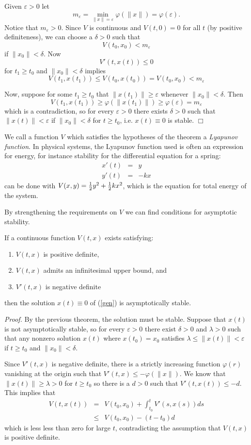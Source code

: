 \documentclass[12pt]{article}
\def\a{for every }
\def\e{there exists }
\def\pf{{\em Proof. }}
\def\eps{\varepsilon}
\def\vphi{\varphi}
\begin{document}
Given $\eps > 0$ let 
$$m_{\eps} = \min_{\| x \| = \eps} \vphi (\| x \| ) = \vphi (\eps).$$ Notice that
$m_{\eps} > 0$.  Since $V$ is continuous and $V(t,0) = 0$ for all $t$
(by positive definiteness),
we can choose a $\delta > 0$ such that 
$$V(t_0, x_0) < m_{\eps}$$ 
if $\|x_0 \| < \delta$.  Now 
$$V'(t,x(t)) \le 0$$ 
for $t_1 \ge t_0$ and $\| x_0 \| < \delta$ implies
$$V(t_1, x(t_1)) \le V(t_0,x(t_0)) = V(t_0,x_0) < m_{\eps}$$

Now, suppose for some $t_1 \ge t_0$ that $\| x(t_1) \| \ge \eps$
whenever $\| x_0 \| < \delta$.  Then 
$$V(t_1,x(t_1)) \ge \vphi (\| x(t_1) \| ) \ge \vphi (\eps) =
m_{\eps}$$
which is a contradiction, so \a $\eps > 0$ \e $\delta > 0$ such that
$\| x(t) \| < \eps$ if $\| x_0 \| < \delta$ for $t \ge t_0$,
i.e. $x(t) \equiv 0$ is stable.  $\Box$

We call a function $V$ which satisfies the hypotheses of the theorem a
{\em Lyapunov function}.  In physical systems, the Lyapunov function
used is often an expression for energy, for instance stability for the
differential equation for a spring: 
\begin{eqnarray*}
x'(t) & = & y\\
y'(t) & = & -kx
\end{eqnarray*}
can be done with $V(x,y) = {1 \over 2} y^2 + {1 \over 2} k x^2$, which is the equation
for total energy of the system.

By strengthening the requirements on $V$ we can find conditions for
asymptotic stability.

\begin{thm}
	If a continuous function $V(t,x)$ exists satisfying:
\begin{enumerate}
\item $V(t,x)$ is positive definite,
\item $V(t,x)$ admits an infinitesimal upper bound, and
\item $V'(t,x)$ is negative definite
\end{enumerate}
then the solution $x(t) \equiv 0$ of (\ref{gen}) is asymptotically
stable.
\end{thm}

\pf  By the previous theorem, the solution must be stable.  Suppose
that $x(t)$ is not asymptotically stable, so \a $\eps >0$ there exist
$\delta > 0$ and $\lambda > 0$ such that any nonzero solution $x(t)$ where
$x(t_0) = x_0$ satisfies $\lambda \le \| x(t) \| < \eps$ if $t \ge
t_0$ and $\| x_0 \| < \delta$.

Since $V'(t,x)$ is negative definite, there is a strictly increasing function
$\vphi (r)$ vanishing at the origin such that $V'(t,x) \le -
\vphi(\| x \|)$.  We know that $\| x(t) \| \ge \lambda > 0$ for $t \ge
t_0$ so there is a $d > 0$ such that $V'(t,x(t)) \le -d$.  This
implies that 
\begin{eqnarray*}
	V(t,x(t)) & = & V(t_0,x_0) + \int^t_{t_0} V'(s,x(s)) ds \\
	& \le & V(t_0,x_0) - (t- t_0) d
\end{eqnarray*}
which is less less than zero for large $t$, contradicting the
assumption that $V(t,x)$ is positive definite.
\end{document}
